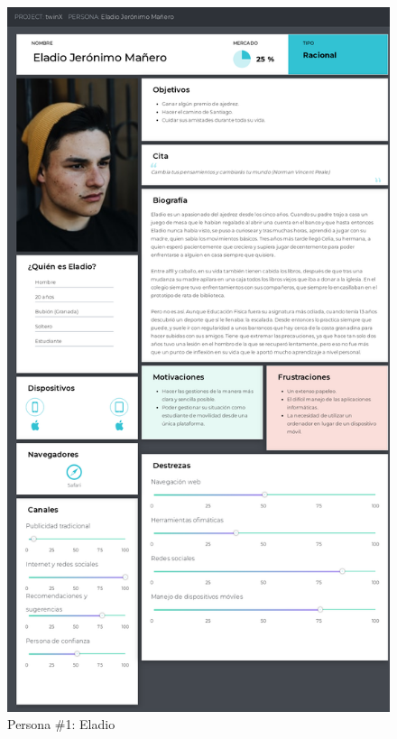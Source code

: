 \begin{figure}
	\centering
	\includegraphics[width=\textwidth, height=\textheight, keepaspectratio]{img/Personas/Eladio}
	\caption[Persona \#1]{Persona \#1: Eladio}
	\label{fig:persona1}
\end{figure}

